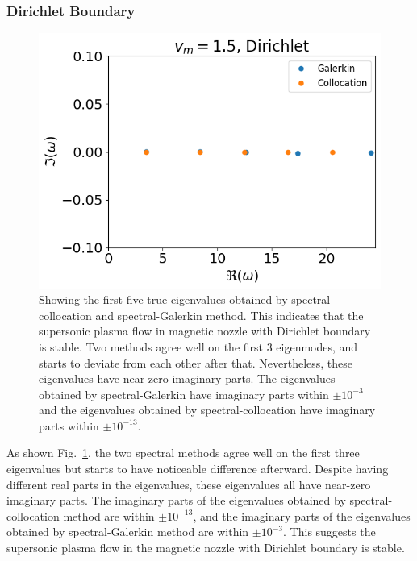 \subsubsection*{Dirichlet Boundary}
\begin{figure} [htbp!]
	\centering
	\includegraphics[width=0.7\linewidth]{figures/supersonic-drichlet.png}
	\caption{Showing the first five true eigenvalues obtained by spectral-collocation and spectral-Galerkin method. This indicates that the supersonic plasma flow in magnetic nozzle with Dirichlet boundary is stable. Two methods agree well on the first 3 eigenmodes, and starts to deviate from each other after that. Nevertheless, these eigenvalues have near-zero imaginary parts. The eigenvalues obtained by spectral-Galerkin have imaginary parts within $\pm10^{-3}$ and the eigenvalues obtained by spectral-collocation have imaginary parts within $\pm10^{-13}$.}
	\label{fig:supersonic-dirichlet}
\end{figure}
As shown Fig.~\ref{fig:supersonic-dirichlet}, the two spectral methods agree well on the first three eigenvalues but starts to have noticeable difference afterward. Despite having different real parts in the eigenvalues, these eigenvalues all have near-zero imaginary parts. The imaginary parts of the eigenvalues obtained by spectral-collocation method are within $\pm10^{-13}$, and the imaginary parts of the eigenvalues obtained by spectral-Galerkin method are within $\pm10^{-3}$. This suggests the supersonic plasma flow in the magnetic nozzle with Dirichlet boundary is stable.

